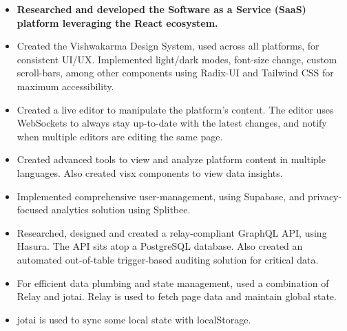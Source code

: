 \documentclass[10pt,a4paper,ragged2e,withhyper]{altacv}
\begin{document}
\tagline{}

\makecvheader



\begin{paracol}{2}


\begin{itemize}
\item \textbf{Researched and developed the Software as a Service (SaaS) platform leveraging the React ecosystem.}
\item Created the Vishwakarma Design System, used across all platforms, for consistent UI/UX.
      Implemented light/dark modes, font-size change, custom scroll-bars, among other components using Radix-UI and Tailwind CSS for maximum accessibility.
\item Created a live editor to manipulate the platform's content.
      The editor uses WebSockets to always stay up-to-date with the latest changes, and notify when multiple editors are editing the same page.
\item Created advanced tools to view and analyze platform content in multiple languages.
      Also created visx components to view data insights.
\item Implemented comprehensive user-management, using Supabase, and privacy-focused analytics solution using Splitbee.
\item Researched, designed and created a relay-compliant GraphQL API, using Hasura.
      The API sits atop a PostgreSQL database.
      Also created an automated out-of-table trigger-based auditing solution for critical data.
\item For efficient data plumbing and state management, used a combination of Relay and jotai.
      Relay is used to fetch page data and maintain global state.
\item jotai is used to sync some local state with localStorage.

\end{itemize}
\end{paracol}
\end{document}
